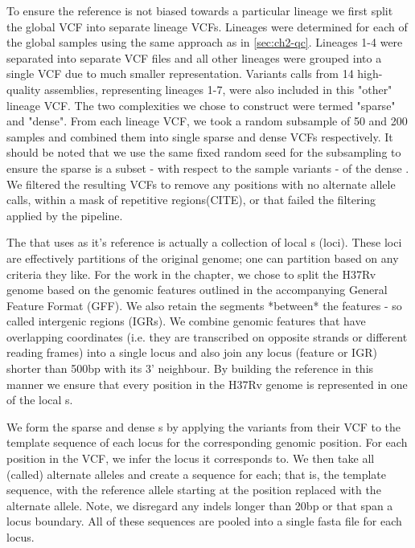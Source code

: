 To ensure the reference \prg{} is not biased towards a particular lineage we first split the global \cryptic{} VCF into separate lineage VCFs. Lineages were determined for each of the global samples using the same approach as in \autoref{sec:ch2-qc}. Lineages 1-4 were separated into separate VCF files and all other lineages were grouped into a single VCF due to much smaller representation. Variants calls from 14 high-quality \mtb{} assemblies, representing lineages 1-7, were also included in this "other" lineage VCF. The two \prg{} complexities we chose to construct were termed "sparse" and "dense". From each lineage VCF, we took a random subsample of 50 and 200 samples and combined them into single sparse and dense VCFs respectively. It should be noted that we use the same fixed random seed for the subsampling to ensure the sparse \prg{} is a subset - with respect to the sample variants - of the dense \prg{}. We filtered the resulting VCFs to remove any positions with no alternate allele calls, within a mask of repetitive regions(CITE), or that failed the filtering applied by the \cryptic{} pipeline.  

The \prg{} that \pandora{} uses as it's reference is actually a collection of local \prg{}s (loci). These loci are effectively partitions of the original genome; one can partition based on any criteria they like. For the work in the chapter, we chose to split the H37Rv genome based on the genomic features outlined in the accompanying General Feature Format (GFF). We also retain the segments *between* the features - so called intergenic regions (IGRs). We combine genomic features that have overlapping coordinates (i.e. they are transcribed on opposite strands or different reading frames) into a single locus and also join any locus (feature or IGR) shorter than 500bp with its 3' neighbour. By building the reference \prg{} in this manner we ensure that every position in the H37Rv genome is represented in one of the local \prg{}s.  

We form the sparse and dense \prg{}s by applying the variants from their VCF to the template sequence of each locus for the corresponding genomic position. For each position in the VCF, we infer the locus it corresponds to. We then take all (called) alternate alleles and create a sequence for each; that is, the template sequence, with the reference allele starting at the position replaced with the alternate allele. Note, we disregard any indels longer than 20bp or that span a locus boundary. All of these sequences are pooled into a single fasta file for each locus. 

